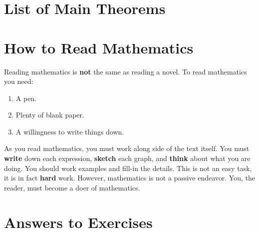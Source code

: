 \documentclass[justified,openany,nofonts]{tufte-book}
\begin{document}
\chapter*{List of Main Theorems}%






\chapter*{How to Read Mathematics}

Reading mathematics is \textbf{not} the same as reading a
novel. To read mathematics you need: 
\begin{enumerate}
\item A pen. 
\item Plenty of blank paper. 
\item A willingness to write things down.
\end{enumerate}
As you read mathematics, you must work along side of the text
itself. You must \textbf{write} down each expression, \textbf{sketch}
each graph, and \textbf{think} about what you are doing. You should
work examples and fill-in the details. This is not an easy task, it is
in fact \textbf{hard} work. However, mathematics is not a passive
endeavor. You, the reader, must become a doer of mathematics.



\setcounter{chapter}{-1}







%
%

\finalizeanswers
\chapter*{Answers to Exercises}
\small
{}
\normalsize
\backmatter
\printindex
\end{document}
